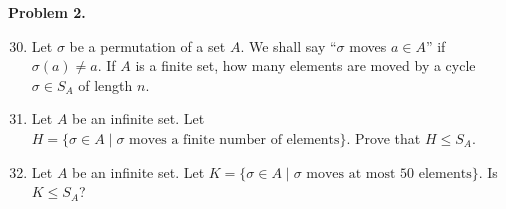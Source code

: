 \documentclass[12pt, letterpaper]{article}
\newenvironment{problem}
    [1]
    {\noindent \textbf{Problem #1.}}
    {\vspace{3mm}}
\begin{document}
\begin{problem}{2}
    \begin{enumerate}
        \setcounter{enumi}{29}

        \item Let $\sigma$ be a permutation of a set $A$. We shall say ``$\sigma$ moves $a \in A$'' if 
        $\sigma(a) \neq a$. If $A$ is a finite set, how many elements are moved by a cycle $\sigma \in 
        S_A$ of length $n$.

        \item Let $A$ be an infinite set. Let $H = \{\sigma \in A \;|\; \sigma \text{ moves a finite number of elements}\}$.
        Prove that $H \le S_A$.

        \item Let $A$ be an infinite set. Let $K = \{\sigma \in A \;|\; \sigma \text{ moves at most 50 elements}\}$.
        Is $K \le S_A$?
    \end{enumerate}
\end{problem}
\end{document}
